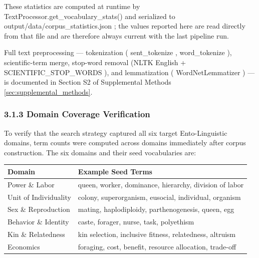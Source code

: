 \documentclass[
]{article}
\newcounter{none} %
\numberwithin{equation}{section}
\renewcommand{\texttt}[1]{%
    \colorbox{codebg}{\color{codefg}\ttfamily #1}%
}
\begin{document}
These statistics are computed at runtime by
\texttt{TextProcessor.get\_vocabulary\_stats()} and serialized to
\texttt{output/data/corpus\_statistics.json}; the values reported here
are read directly from that file and are therefore always current with
the last pipeline run.

Full text preprocessing --- tokenization (\texttt{sent\_tokenize},
\texttt{word\_tokenize}), scientific-term merge, stop-word removal (NLTK
English + \texttt{SCIENTIFIC\_STOP\_WORDS}), and lemmatization
(\texttt{WordNetLemmatizer}) --- is documented in Section S2 of
Supplemental Methods \ref{sec:supplemental_methods}.

\subsubsection{3.1.3 Domain Coverage
Verification}\label{domain-coverage-verification}

To verify that the search strategy captured all six target
Ento-Linguistic domains, term counts were computed across domains
immediately after corpus construction. The six domains and their seed
vocabularies are:

{\def\LTcaptype{none} %
\begin{longtable}[]{@{}
  >{\raggedright\arraybackslash}p{}
  >{\raggedright\arraybackslash}p{}@{}}
\toprule\noalign{}
\begin{minipage}[b]{\linewidth}\raggedright
Domain
\end{minipage} & \begin{minipage}[b]{\linewidth}\raggedright
Example Seed Terms
\end{minipage} \\
\midrule\noalign{}
\endhead
\bottomrule\noalign{}
\endlastfoot
Power \& Labor & queen, worker, dominance, hierarchy, division of
labor \\
Unit of Individuality & colony, superorganism, eusocial, individual,
organism \\
Sex \& Reproduction & mating, haplodiploidy, parthenogenesis, queen,
egg \\
Behavior \& Identity & caste, forager, nurse, task, polyethism \\
Kin \& Relatedness & kin selection, inclusive fitness, relatedness,
altruism \\
Economics & foraging, cost, benefit, resource allocation, trade-off \\
\end{longtable}
}
\end{document}
